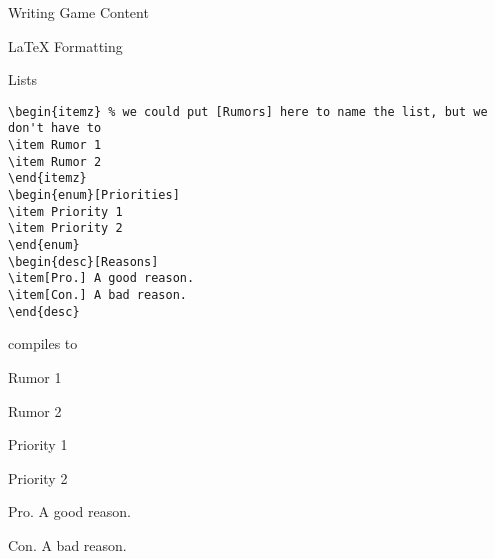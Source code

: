 \documentclass[sheet]{GameTexBase}
\begin{document}
\begin{section}{Writing Game Content}
\begin{subsection}{\LaTeX{} Formatting}
\begin{subsubsection}{\gametex{} Lists}
\begin{verbatim}
\begin{itemz} % we could put [Rumors] here to name the list, but we don't have to
\item Rumor 1
\item Rumor 2
\end{itemz}
\begin{enum}[Priorities]
\item Priority 1
\item Priority 2
\end{enum}
\begin{desc}[Reasons]
\item[Pro.] A good reason.
\item[Con.] A bad reason.
\end{desc}
\end{verbatim}
compiles to 
\begin{itemz} %
\item Rumor 1
\item Rumor 2
\end{itemz}
\begin{enum}[Priorities]
\item Priority 1
\item Priority 2
\end{enum}
\begin{desc}[Reasons]
\item[Pro.] A good reason.
\item[Con.] A bad reason.
\end{desc}
\end{subsubsection}
\end{subsection}
\end{section}
\end{document}

